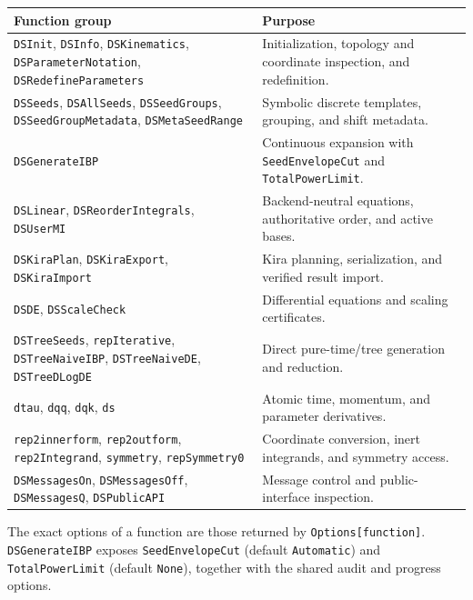 ﻿\documentclass[a4paper,11pt]{article}
\begin{document}
\small
\begin{longtable}{@{}p{}p{}@{}}
\toprule
\textbf{Function group} & \textbf{Purpose} \\
\midrule
\texttt{DSInit}, \texttt{DSInfo}, \texttt{DSKinematics},
\texttt{DSParameterNotation}, \texttt{DSRedefineParameters}
& Initialization, topology and coordinate inspection, and redefinition. \\
\texttt{DSSeeds}, \texttt{DSAllSeeds}, \texttt{DSSeedGroups},
\texttt{DSSeedGroupMetadata}, \texttt{DSMetaSeedRange}
& Symbolic discrete templates, grouping, and shift metadata. \\
\texttt{DSGenerateIBP}
& Continuous expansion with \texttt{SeedEnvelopeCut} and \texttt{TotalPowerLimit}. \\
\texttt{DSLinear}, \texttt{DSReorderIntegrals}, \texttt{DSUserMI}
& Backend-neutral equations, authoritative order, and active bases. \\
\texttt{DSKiraPlan}, \texttt{DSKiraExport}, \texttt{DSKiraImport}
& Kira planning, serialization, and verified result import. \\
\texttt{DSDE}, \texttt{DSScaleCheck}
& Differential equations and scaling certificates. \\
\texttt{DSTreeSeeds}, \texttt{repIterative}, \texttt{DSTreeNaiveIBP},
\texttt{DSTreeNaiveDE}, \texttt{DSTreeDLogDE}
& Direct pure-time/tree generation and reduction. \\
\texttt{dtau}, \texttt{dqq}, \texttt{dqk}, \texttt{ds}
& Atomic time, momentum, and parameter derivatives. \\
\texttt{rep2innerform}, \texttt{rep2outform}, \texttt{rep2Integrand},
\texttt{symmetry}, \texttt{repSymmetry0}
& Coordinate conversion, inert integrands, and symmetry access. \\
\texttt{DSMessagesOn}, \texttt{DSMessagesOff}, \texttt{DSMessagesQ},
\texttt{DSPublicAPI}
& Message control and public-interface inspection. \\
\bottomrule
\end{longtable}
\normalsize

The exact options of a function are those returned by \texttt{Options[function]}.
\texttt{DSGenerateIBP} exposes \texttt{SeedEnvelopeCut} (default \texttt{Automatic})
and \texttt{TotalPowerLimit} (default \texttt{None}), together with the shared audit
and progress options.
\end{document}
